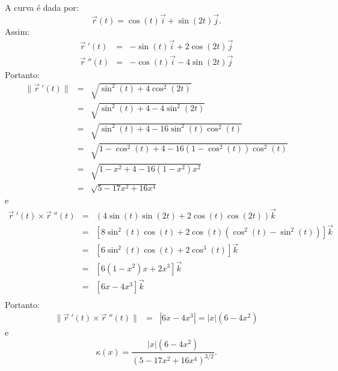 \begin{resol}
A curva é dada por:
$$\vec{r}(t)=\cos (t)\vec{i}+ \sin (2t)\vec{j}.$$
Assim:
 \begin{eqnarray*}
    \vec{r}~\!'(t)&=&-\sin(t)\vec{i}+ 2\cos(2t)\vec{j}\\
  \vec{r}~\!''(t)&=&-\cos (t)\vec{i}-4 \sin (2t)\vec{j}
 \end{eqnarray*}
 Portanto:
 \begin{eqnarray*}
  \|\vec{r}~\!'(t)\|&=&\sqrt{\sin^2(t)+4\cos^2(2t)}\\
  &=&\sqrt{\sin^2(t)+4-4\sin^2(2t)}\\
  &=&\sqrt{\sin^2(t)+4-16\sin^2(t)\cos^2(t)}\\
  &=&\sqrt{1-\cos^2(t)+4-16\left(1-\cos^2(t)\right)\cos^2(t)}\\
  &=&\sqrt{1-x^2+4-16(1-x^2)x^2}\\
  &=&\sqrt{5-17x^2+16x^4}
 \end{eqnarray*}
e
 \begin{eqnarray*}
    \vec{r}~\!'(t)\times \vec{r}~\!''(t)&=&\left(4\sin(t)\sin(2t)+2\cos(t)\cos(2t)\right)\vec{k}\\
 &=&\left[8\sin^2(t)\cos(t)+2\cos(t)\left(\cos^2(t)-\sin^2(t)\right)\right]\vec{k}\\
 &=&\left[6\sin^2(t)\cos(t)+2\cos^3(t)\right]\vec{k}\\
 &=&\left[6(1-x^2)x+2x^3\right]\vec{k}\\
 &=&\left[6x-4x^3\right]\vec{k}\\
  \end{eqnarray*}
  Portanto:
   \begin{eqnarray*}
    \|\vec{r}~\!'(t)\times \vec{r}~\!''(t)\|
 &=&|6x-4x^3|=|x|(6-4x^2)
  \end{eqnarray*}
e
$$\kappa(x)=\frac{|x|(6-4x^2)}{\left(5-17x^2+16x^4\right)^{3/2}}. $$


\end{resol}
